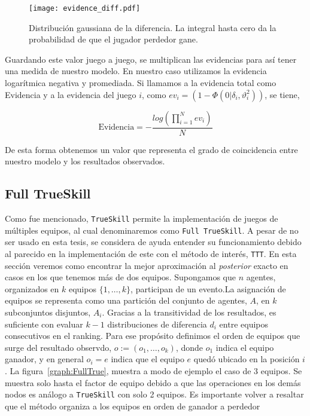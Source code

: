 \documentclass[11pt,twoside,spanish]{report} %
\begin{document}
\begin{figure}[H]
	\centering
	\texttt{[image: evidence\_diff.pdf]}
	\caption{Distribuci\'on gaussiana de la diferencia. La integral hasta cero da la probabilidad de que el jugador perdedor gane.}
	\label{fig:evidenciadiff}
\end{figure}

Guardando este valor juego a juego, se multiplican las evidencias para as\'i tener una medida de nuestro modelo. En nuestro caso utilizamos la evidencia logar\'itmica negativa y promediada.
Si llamamos a la evidencia total como Evidencia y a la evidencia del juego $i$, como $ev_i=(1-\Phi(0|\delta_i,\vartheta_i^2))$, se tiene,

\begin{equation}
	\text{Evidencia} = -\frac{log(\prod_{i=1}^{N}ev_i)}{N}
\end{equation}  

De esta forma obtenemos un  valor que representa el grado de coincidencia entre nuestro modelo y los resultados observados.


\subsection{Full TrueSkill}\label{sec:iterative_posterior}


Como fue mencionado, \texttt{TrueSkill} permite la implementaci\'on de juegos de m\'ultiples equipos, al cual denominaremos como \texttt{Full TrueSkill}.
A pesar de no ser usado en esta tesis, se considera de ayuda entender su funcionamiento debido al parecido en la implementaci\'on de este con el m\'etodo de inter\'es, \texttt{TTT}.
En esta secci\'on veremos como encontrar la mejor aproximaci\'on al \textit{posterior} exacto en casos en los que tenemos más de dos equipos.
Supongamos que $n$ agentes, organizados en $k$ equipos $\{1, \dots, k\}$, participan de un evento.La asignaci\'on de equipos se representa como una partici\'on del conjunto de agentes, $A$, en $k$ subconjuntos disjuntos, $A_i$.
Gracias a la transitividad de los resultados, es suficiente con evaluar $k-1$ distribuciones de diferencia $d_i$ entre equipos consecutivos en el ranking.
Para ese prop\'osito definimos el orden de equipos que surge del resultado observdo, $o := (o_1, \dots, o_k)$, donde $o_1$ indica el equipo ganador, y en general $o_i = e$ indica que el equipo $e$ qued\'o ubicado en la posici\'on $i$.
La figura~\ref{graph:FullTrue}, muestra a modo de ejemplo el caso de 3 equipos.
Se muestra solo hasta el factor de equipo debido a que las operaciones en los dem\'as nodos es an\'alogo a \texttt{TrueSkill} con solo 2 equipos.
Es importante volver a resaltar que el m\'etodo organiza a los equipos en orden de ganador a perdedor
\end{document}
